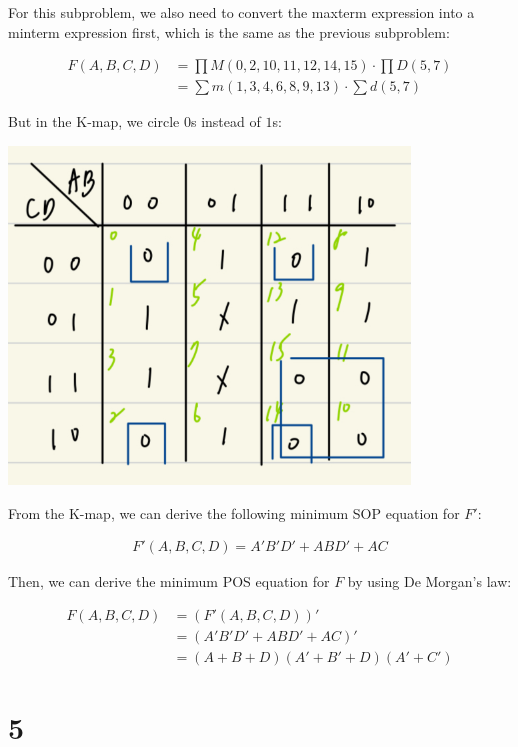 \documentclass{article}
\begin{document}
For this subproblem, we also need to convert the maxterm expression into a minterm expression first, which is the same as the previous subproblem:

\begin{align*}
    F(A, B, C, D) 
    &= \prod M(0, 2, 10, 11, 12, 14, 15) \cdot \prod D(5, 7) \\
    &= \sum m(1, 3, 4, 6, 8, 9, 13) \cdot \sum d(5, 7)
\end{align*}

But in the K-map, we circle $0$s instead of $1$s:

\begin{center}
    \includegraphics[width=0.8\textwidth]{HW2_4(2)_KMap}
\end{center}

From the K-map, we can derive the following minimum SOP equation for $F'$:

\begin{align*}
    F'(A, B, C, D) = A'B'D' + ABD' + AC
\end{align*}

Then, we can derive the minimum POS equation for $F$ by using De Morgan's law:

\begin{align*}
    F(A, B, C, D) 
    &= (F'(A, B, C, D))' \\
    &= (A'B'D' + ABD' + AC)' \\
    &= (A + B + D)(A' + B' + D)(A' + C')
\end{align*}
\newpage

\section*{5}
\end{document}
